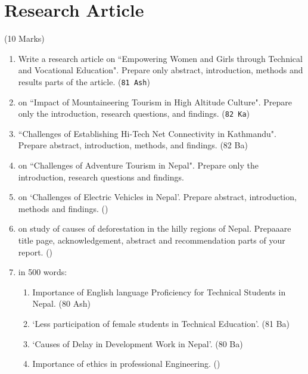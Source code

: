 \documentclass[12pt]{article}
\begin{document}
\pagebreak

\section{Research Article}
  \begin{center} (10 Marks) \end{center}

  \begin{enumerate}
    \item Write a research article on ``Empowering Women and Girls through Technical and Vocational Education". Prepare only abstract, introduction, methods and results parts of the article. \hfill (\texttt{81 Ash})

    \item on ``Impact of Mountaineering Tourism in High Altitude Culture". Prepare only the introduction, research questions, and findings. \hfill (\texttt{82 Ka})

    \item ``Challenges of Establishing Hi-Tech Net Connectivity in Kathmandu". Prepare abstract, introduction, methods, and findings. \hfill (82 Ba)

    \item on ``Challenges of Adventure Tourism in Nepal". Prepare only the introduction, research questions and findings. \hfill {}

    \item on `Challenges of Electric Vehicles in Nepal'. Prepare abstract, introduction, methods and findings. \hfill ()

    \item on study of causes of deforestation in the hilly regions of Nepal. Prepaaare title page, acknowledgement, abstract and recommendation parts of your report. \hfill ()

    \item in 500 words:
      \begin{enumerate}
        \item Importance of English language Proficiency for Technical Students in Nepal. \hfill (80 Ash)

        \item `Less participation of female students in Technical Education'. \hfill (81 Ba)

        \item `Causes of Delay in Development Work in Nepal'. \hfill (80 Ba)

        \item Importance of ethics in professional Engineering. ()


\end{enumerate}
\end{enumerate}
\end{document}

